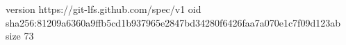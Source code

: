 version https://git-lfs.github.com/spec/v1
oid sha256:81209a6360a9ffb5cd1b937965e2847bd34280f6426faa7a070e1c7f09d123ab
size 73
